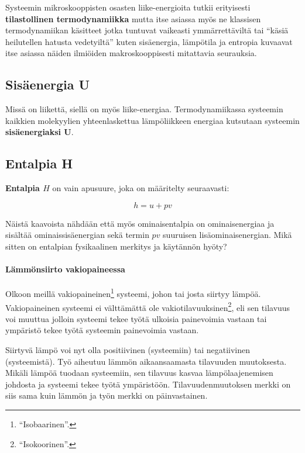 \documentclass[12pt,a4paper,finnish]{book}
\begin{document}
Systeemin mikroskooppisten osasten liike-energioita tutkii erityisesti \textbf{tilastollinen termodynamiikka} mutta itse asiassa 
myös ne klassisen termodynamiikan käsitteet jotka tuntuvat vaikeasti ymmärrettäviltä tai ``käsiä heilutellen hatusta vedetyiltä'' 
kuten sisäenergia, lämpötila ja entropia kuvaavat itse asiassa näiden ilmiöiden makroskooppisesti mitattavia seurauksia.

\subsection{Sisäenergia U}

Missä on liikettä, siellä on myös liike-energiaa. Termodynamiikassa systeemin kaikkien molekyylien yhteenlaskettua lämpöliikkeen 
energiaa kutsutaan systeemin \textbf{sisäenergiaksi U}. 

\subsection{Entalpia H} \label{sssection:entalpia} %

\textbf{Entalpia $H$} on vain apusuure, joka on määritelty seuraavasti:

\begin{equation}
 h = u + pv
\end{equation}

Näistä kaavoista nähdään että myös ominaisentalpia on ominaisenergiaa ja sisältää ominaissisäenergian sekä termin $pv$ 
suuruisen lisäominaisenergian. Mikä sitten on entalpian fysikaalinen merkitys ja käytännön hyöty?


\paragraph{Lämmönsiirto vakiopaineessa}

Olkoon meillä vakiopaineinen\footnote{``Isobaarinen''.} systeemi, johon tai josta siirtyy lämpöä. Vakiopaineinen systeemi 
ei välttämättä ole vakiotilavuuksinen\footnote{``Isokoorinen''.}, eli sen tilavuus voi muuttua jolloin systeemi tekee 
työtä ulkoisia painevoimia vastaan tai ympäristö tekee työtä systeemin painevoimia vastaan. 

Siirtyvä lämpö voi nyt  
olla positiivinen (systeemiin) tai negatiivinen (systeemistä). Työ aiheutuu lämmön aikaansaamasta tilavuuden muutoksesta. 
Mikäli lämpöä tuodaan systeemiin, sen tilavuus kasvaa lämpölaajenemisen johdosta ja systeemi tekee työtä ympäristöön. 
Tilavuudenmuutoksen merkki on siis sama kuin lämmön ja työn merkki on päinvastainen.
\end{document}
